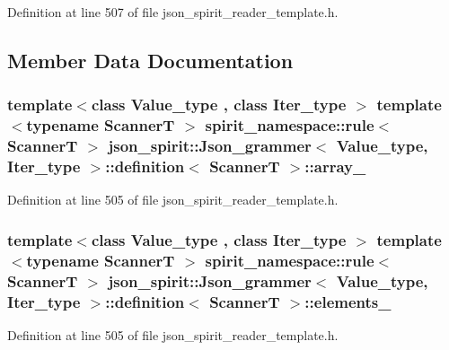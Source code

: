 Definition at line 507 of file json\+\_\+spirit\+\_\+reader\+\_\+template.\+h.



\subsection{Member Data Documentation}
\hypertarget{classjson__spirit_1_1_json__grammer_1_1definition_a0bf73f379e424f5e3b60318c6161aa7f}{}
\subsubsection[{array\+\_\+}]{\setlength{\rightskip}{0pt plus 5cm}template$<$class Value\+\_\+type , class Iter\+\_\+type $>$ template$<$typename Scanner\+T $>$ spirit\+\_\+namespace\+::rule$<$ Scanner\+T $>$ {\bf json\+\_\+spirit\+::\+Json\+\_\+grammer}$<$ {\bf Value\+\_\+type}, Iter\+\_\+type $>$\+::{\bf definition}$<$ Scanner\+T $>$\+::array\+\_\+}\label{classjson__spirit_1_1_json__grammer_1_1definition_a0bf73f379e424f5e3b60318c6161aa7f}


Definition at line 505 of file json\+\_\+spirit\+\_\+reader\+\_\+template.\+h.

\hypertarget{classjson__spirit_1_1_json__grammer_1_1definition_a43473ad5f8e968259fbef7b28e793b58}{}
\subsubsection[{elements\+\_\+}]{\setlength{\rightskip}{0pt plus 5cm}template$<$class Value\+\_\+type , class Iter\+\_\+type $>$ template$<$typename Scanner\+T $>$ spirit\+\_\+namespace\+::rule$<$ Scanner\+T $>$ {\bf json\+\_\+spirit\+::\+Json\+\_\+grammer}$<$ {\bf Value\+\_\+type}, Iter\+\_\+type $>$\+::{\bf definition}$<$ Scanner\+T $>$\+::elements\+\_\+}\label{classjson__spirit_1_1_json__grammer_1_1definition_a43473ad5f8e968259fbef7b28e793b58}


Definition at line 505 of file json\+\_\+spirit\+\_\+reader\+\_\+template.\+h.

